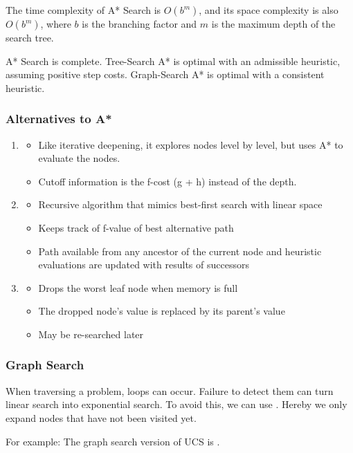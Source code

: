 \documentclass[
../EiKI_Summary.tex,
]
{subfiles}
\begin{document}
 The time complexity of A* Search is $O(b^m)$, and its space complexity is also $O(b^m)$, where $b$ is the branching factor and $m$ is the maximum depth of the search tree.

 A* Search is complete. Tree-Search A* is optimal with an admissible heuristic, assuming positive step costs. Graph-Search A* is optimal with a consistent heuristic.

\subsubsection{Alternatives to A*}
\begin{enumerate}
    \item {}
    \begin{itemize}
        \item Like iterative deepening, it explores nodes level by level, but uses A* to evaluate the nodes.
        \item Cutoff information is the f-cost (g + h) instead of the depth.
    \end{itemize}
    \item {}
    \begin{itemize}
        \item Recursive algorithm that mimics best-first search with linear space
        \item Keeps track of f-value of best alternative path
        \item Path available from any ancestor of the current node and heuristic evaluations are updated with results of successors
    \end{itemize}
    \item {}
    \begin{itemize}
        \item Drops the worst leaf node when memory is full
        \item The dropped node's value is replaced by its parent's value
        \item May be re-searched later
    \end{itemize}
\end{enumerate}

\subsubsection{Graph Search}
When traversing a problem, loops can occur. Failure to detect them can turn linear search into exponential search.
To avoid this, we can use . Hereby we only expand nodes that have not been visited yet.

For example: The graph search version of UCS is .
\end{document}

